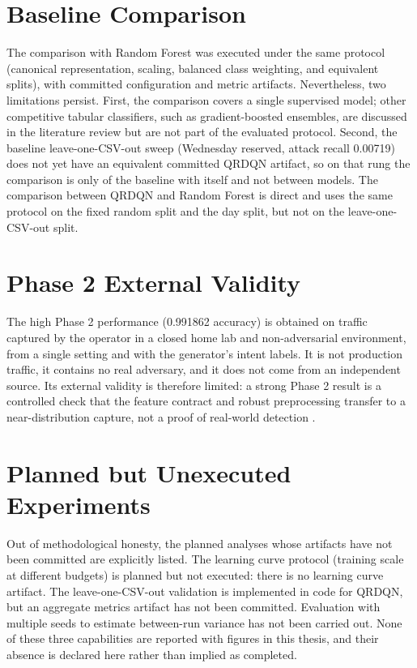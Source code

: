 \section{Baseline Comparison}
The comparison with Random Forest was executed under the same protocol (canonical representation, scaling, balanced class weighting, and equivalent splits), with committed configuration and metric artifacts. Nevertheless, two limitations persist. First, the comparison covers a single supervised model; other competitive tabular classifiers, such as gradient-boosted ensembles, are discussed in the literature review but are not part of the evaluated protocol. Second, the baseline leave-one-CSV-out sweep (Wednesday reserved, attack recall 0.00719) does not yet have an equivalent committed QRDQN artifact, so on that rung the comparison is only of the baseline with itself and not between models. The comparison between QRDQN and Random Forest is direct and uses the same protocol on the fixed random split and the day split, but not on the leave-one-CSV-out split.

\section{Phase 2 External Validity}
The high Phase 2 performance (0.991862 accuracy) is obtained on traffic captured by the operator in a closed home lab and non-adversarial environment, from a single setting and with the generator's intent labels. It is not production traffic, it contains no real adversary, and it does not come from an independent source. Its external validity is therefore limited: a strong Phase 2 result is a controlled check that the feature contract and robust preprocessing transfer to a near-distribution capture, not a proof of real-world detection \parencite{SommerPaxson2010ClosedWorld,Layeghy2023CrossDomainNIDS}.

\section{Planned but Unexecuted Experiments}
Out of methodological honesty, the planned analyses whose artifacts have not been committed are explicitly listed. The learning curve protocol (training scale at different budgets) is planned but not executed: there is no learning curve artifact. The leave-one-CSV-out validation is implemented in code for QRDQN, but an aggregate metrics artifact has not been committed. Evaluation with multiple seeds to estimate between-run variance has not been carried out. None of these three capabilities are reported with figures in this thesis, and their absence is declared here rather than implied as completed.

